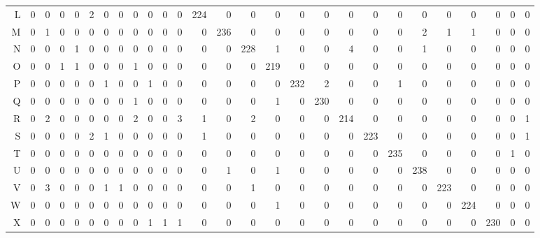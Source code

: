 \begin{table}[ht]
\begin{adjustbox}{max width=\textwidth}
\begin{tabular}{rrrrrrrrrrrrrrrrrrrrrrrrrrr}
  L &   0 &   0 &   0 &   0 &   2 &   0 &   0 &   0 &   0 &   0 &   0 & 224 &   0 &   0 &   0 &   0 &   0 &   0 &   0 &   0 &   0 &   0 &   0 &   0 &   0 &   0 \\ 
  M &   0 &   1 &   0 &   0 &   0 &   0 &   0 &   0 &   0 &   0 &   0 &   0 & 236 &   0 &   0 &   0 &   0 &   0 &   0 &   0 &   2 &   1 &   1 &   0 &   0 &   0 \\ 
  N &   0 &   0 &   0 &   1 &   0 &   0 &   0 &   0 &   0 &   0 &   0 &   0 &   0 & 228 &   1 &   0 &   0 &   4 &   0 &   0 &   1 &   0 &   0 &   0 &   0 &   0 \\ 
  O &   0 &   0 &   1 &   1 &   0 &   0 &   0 &   1 &   0 &   0 &   0 &   0 &   0 &   0 & 219 &   0 &   0 &   0 &   0 &   0 &   0 &   0 &   0 &   0 &   0 &   0 \\ 
  P &   0 &   0 &   0 &   0 &   0 &   1 &   0 &   0 &   1 &   0 &   0 &   0 &   0 &   0 &   0 & 232 &   2 &   0 &   0 &   1 &   0 &   0 &   0 &   0 &   0 &   0 \\ 
  Q &   0 &   0 &   0 &   0 &   0 &   0 &   0 &   1 &   0 &   0 &   0 &   0 &   0 &   0 &   1 &   0 & 230 &   0 &   0 &   0 &   0 &   0 &   0 &   0 &   0 &   0 \\ 
  R &   0 &   2 &   0 &   0 &   0 &   0 &   0 &   2 &   0 &   0 &   3 &   1 &   0 &   2 &   0 &   0 &   0 & 214 &   0 &   0 &   0 &   0 &   0 &   0 &   0 &   1 \\ 
  S &   0 &   0 &   0 &   0 &   2 &   1 &   0 &   0 &   0 &   0 &   0 &   1 &   0 &   0 &   0 &   0 &   0 &   0 & 223 &   0 &   0 &   0 &   0 &   0 &   0 &   1 \\ 
  T &   0 &   0 &   0 &   0 &   0 &   0 &   0 &   0 &   0 &   0 &   0 &   0 &   0 &   0 &   0 &   0 &   0 &   0 &   0 & 235 &   0 &   0 &   0 &   0 &   1 &   0 \\ 
  U &   0 &   0 &   0 &   0 &   0 &   0 &   0 &   0 &   0 &   0 &   0 &   0 &   1 &   0 &   1 &   0 &   0 &   0 &   0 &   0 & 238 &   0 &   0 &   0 &   0 &   0 \\ 
  V &   0 &   3 &   0 &   0 &   0 &   1 &   1 &   0 &   0 &   0 &   0 &   0 &   0 &   1 &   0 &   0 &   0 &   0 &   0 &   0 &   0 & 223 &   0 &   0 &   0 &   0 \\ 
  W &   0 &   0 &   0 &   0 &   0 &   0 &   0 &   0 &   0 &   0 &   0 &   0 &   0 &   0 &   1 &   0 &   0 &   0 &   0 &   0 &   0 &   0 & 224 &   0 &   0 &   0 \\ 
  X &   0 &   0 &   0 &   0 &   0 &   0 &   0 &   0 &   1 &   1 &   1 &   0 &   0 &   0 &   0 &   0 &   0 &   0 &   0 &   0 &   0 &   0 &   0 & 230 &   0 &   0 \\ 

\end{tabular}
\end{adjustbox}
\end{table}
